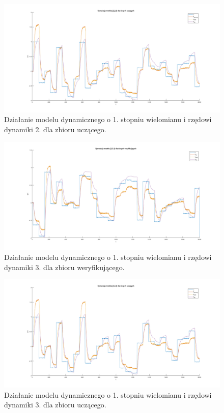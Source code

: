 \begin{figure}[H]
\centering
\includegraphics[width=16cm,trim={5cm 1cm 5cm 1cm},clip]{images/d4.png}
\caption{Działanie modelu dynamicznego o 1. stopniu wielomianu i rzędowi dynamiki 2. dla zbioru uczącego.}
\label{fig:d4}
\end{figure}
\begin{figure}[H]
\centering
\includegraphics[width=16cm,trim={5cm 1cm 5cm 1cm},clip]{images/d5.png}
\caption{Działanie modelu dynamicznego o 1. stopniu wielomianu i rzędowi dynamiki 3. dla zbioru weryfikującego.}
\label{fig:d5}
\end{figure}
\begin{figure}[H]
\centering
\includegraphics[width=16cm,trim={5cm 1cm 5cm 1cm},clip]{images/d6.png}
\caption{Działanie modelu dynamicznego o 1. stopniu wielomianu i rzędowi dynamiki 3. dla zbioru uczącego.}
\label{fig:d6}
\end{figure}
